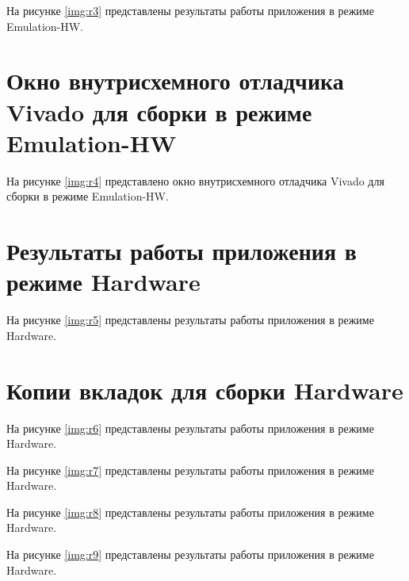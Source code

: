 На рисунке \ref{img:r3} представлены результаты работы приложения в режиме Emulation-HW.



\chapter*{Окно внутрисхемного отладчика Vivado для сборки в режиме Emulation-HW}

На рисунке \ref{img:r4} представлено окно внутрисхемного отладчика Vivado для сборки в режиме Emulation-HW.


\chapter*{Результаты работы приложения в режиме Hardware}

На рисунке \ref{img:r5} представлены результаты работы приложения в режиме Hardware.



\chapter*{Копии вкладок для сборки Hardware}

На рисунке \ref{img:r6} представлены результаты работы приложения в режиме Hardware.

\newpage

На рисунке \ref{img:r7} представлены результаты работы приложения в режиме Hardware.

\newpage

На рисунке \ref{img:r8} представлены результаты работы приложения в режиме Hardware.

\newpage

На рисунке \ref{img:r9} представлены результаты работы приложения в режиме Hardware.

